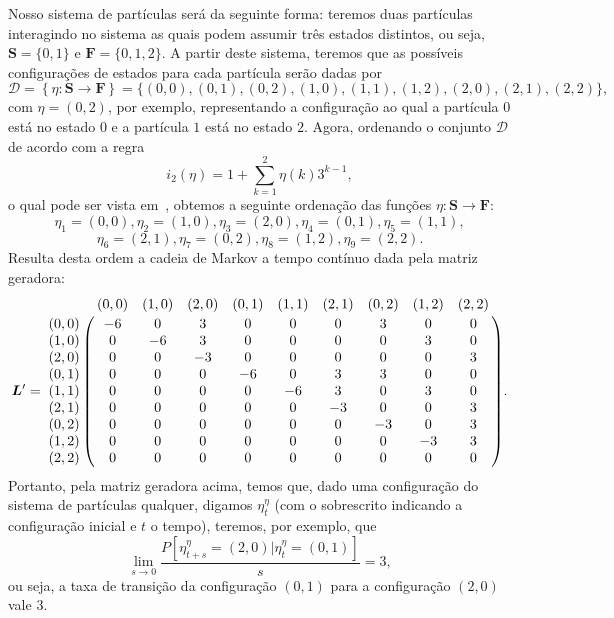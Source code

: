 \documentclass[twoside,openright,titlepage,numbers=noenddot,headinclude,  lineheaders footinclude=true,cleardoublepage=empty,
                                BCOR=5mm,paper=a4,fontsize=12pt ]{scrbook}
\theoremstyle{definition}
\begin{document}
Nosso sistema de partículas será da seguinte forma: teremos duas partículas
interagindo no sistema as quais podem assumir três estados distintos, ou seja,
$\bm{S} = \{0,1\}$ e $\bm{F} = \{0, 1, 2\}$. A partir deste sistema, teremos
que as possíveis configurações de estados para cada partícula serão dadas por
\[
\mathscr{D} = \left\{ \eta: \mathbf{S} \rightarrow \mathbf{F}
\right\} = \{ (0,0), (0,1), (0,2), (1,0), (1,1), (1,2), (2,0), (2,1), (2,2) \},
\]
com $\eta = (0,2)$, por exemplo, representando a configuração ao qual a
partícula $0$ está no estado $0$ e a partícula $1$ está no estado $2$. 
Agora, ordenando o conjunto $\mathscr{D}$ de acordo com a regra
\[
i_2(\eta) = 1 + \sum_{k=1}^2 \eta(k)3^{k-1},
\]
o qual pode ser vista em~\cite{Nparticulas}, obtemos a seguinte ordenação das funções $\eta: \bm{S} \rightarrow \bm{F}$:
\[
\eta_1 = (0,0), 
\eta_2 = (1,0), 
\eta_3 = (2,0), 
\eta_4 = (0,1), 
\eta_5 = (1,1), 
\]
\[
\eta_6 = (2,1), 
\eta_7 = (0,2), 
\eta_8 = (1,2), 
\eta_9 = (2,2).
\]
Resulta desta ordem %
a cadeia de Markov a tempo contínuo dada pela matriz geradora:
\[
\bm{L}' = 
\bordermatrix{~ & (0,0) & (1,0) & (2,0) & (0,1) & (1,1) & (2,1) & (0,2) & (1,2) & (2,2) \cr
   (0,0) &-6 &  0 & 3 &  0 &  0 &  0 & 3 &  0 &  0\cr 
   (1,0) &0 &  -6 & 3 &  0 &  0 &  0 &  0 & 3 &  0\cr
   (2,0) &0 &  0 &  -3 &  0 &  0 &  0 &  0 &  0 & 3\cr
   (0,1) &0 &  0 &  0 &  -6 &  0 & 3 & 3 &  0 &  0\cr
   (1,1) &0 &  0 &  0 &  0 &  -6 & 3 &  0 & 3 &  0\cr
   (2,1) &0 &  0 &  0 &  0 &  0 &  -3 &  0 &  0 & 3\cr
   (0,2) &0 &  0 &  0 &  0 &  0 &  0 &  -3 &  0 & 3\cr
   (1,2) &0 &  0 &  0 &  0 &  0 &  0 &  0 &  -3 & 3\cr
   (2,2) &0 &  0 &  0 &  0 &  0 &  0 &  0 &  0 &  0\cr }.
\]
Portanto, pela matriz geradora acima, temos que, dado uma configuração do sistema
de partículas qualquer, digamos $\eta_t^\eta$ (com o sobrescrito indicando a configuração
inicial e $t$ o tempo), teremos, por exemplo, que
\[
\lim_{s \rightarrow 0} \frac{ P[ \eta_{t+s}^\eta = (2,0) | \eta_t^\eta = (0,1) ]} {s} = 3,
\]
ou seja, a taxa de transição da configuração $(0,1)$ para a configuração $(2,0)$ vale $3$.
\end{document}
